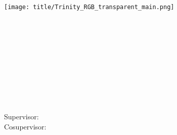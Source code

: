 \begin{titlepage}

\center %



\texttt{[image: title/Trinity\_RGB\_transparent\_main.png]}\\[1cm] 

\Large \school\\[1.5cm] %
\ifdefined\department
\large \department\\[1.5cm] %
\fi

\makeatletter
\ifdefined\thesissubtitle
{ \huge \bfseries \thesistitle}\\ %
\thesissubtitle\\[1.5cm]
\else
{\huge \bfseries \thesistitle}\\[1.5cm]
\fi
 


\ifdefined\authorid
\authorname\\ %
\authorid\\[2cm] %
\else
\authorname\\[2cm] %
\fi


Supervisor: \supervisor\\[2cm] %
\ifdefined\cosupervisor
Cosupervisor: \cosupervisor\\[2cm] %
\fi



\end{titlepage}
